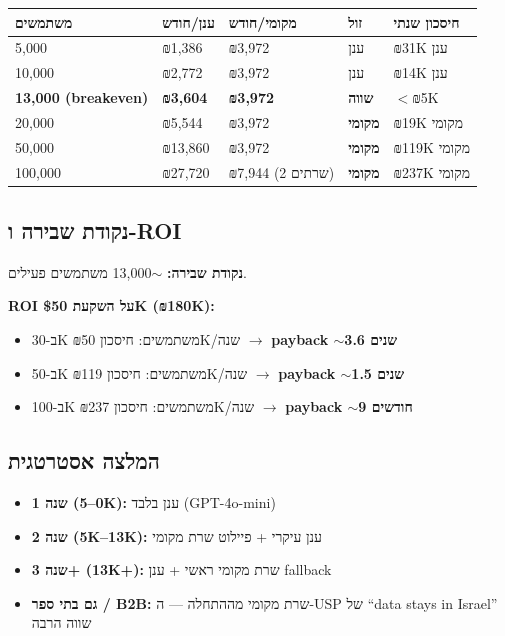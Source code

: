 \documentclass[11pt]{article}
\newcommand{\en}[1]{\textenglish{#1}}
\begin{document}
\begin{longtable}{|>{\raggedright\arraybackslash}p{2.5cm}|>{\raggedright\arraybackslash}p{2.5cm}|>{\raggedright\arraybackslash}p{3.0cm}|>{\raggedright\arraybackslash}p{2.0cm}|>{\raggedright\arraybackslash}p{3.5cm}|}
\hline
\rowcolor{hdr}
\textbf{משתמשים} & \textbf{ענן/חודש} & \textbf{מקומי/חודש} & \textbf{זול} & \textbf{חיסכון שנתי} \\
\hline
\endhead
\en{5,000} & ₪\en{1,386} & ₪\en{3,972} & ענן & ₪\en{31K} ענן \\ \hline
\rowcolor{ltgray}
\en{10,000} & ₪\en{2,772} & ₪\en{3,972} & ענן & ₪\en{14K} ענן \\ \hline
\textbf{\en{13,000} (\en{breakeven})} & \textbf{₪\en{3,604}} & \textbf{₪\en{3,972}} & \textbf{שווה} & $<$₪\en{5K} \\ \hline
\rowcolor{ltgray}
\en{20,000} & ₪\en{5,544} & ₪\en{3,972} & \textbf{מקומי} & ₪\en{19K} מקומי \\ \hline
\en{50,000} & ₪\en{13,860} & ₪\en{3,972} & \textbf{מקומי} & ₪\en{119K} מקומי \\ \hline
\rowcolor{ltgray}
\en{100,000} & ₪\en{27,720} & ₪\en{7,944} (\en{2} שרתים) & \textbf{מקומי} & ₪\en{237K} מקומי \\ \hline
\end{longtable}

\subsection*{נקודת שבירה ו-\en{ROI}}

\textbf{נקודת שבירה:} $\sim$\en{13,000} משתמשים פעילים.

\textbf{\en{ROI} על השקעת \en{\$50K} (₪\en{180K}):}
\begin{itemize}[leftmargin=*]
  \item ב-\en{30K} משתמשים: חיסכון ₪\en{50K}/שנה $\rightarrow$ \textbf{\en{payback} $\sim$\en{3.6} שנים}
  \item ב-\en{50K} משתמשים: חיסכון ₪\en{119K}/שנה $\rightarrow$ \textbf{\en{payback} $\sim$\en{1.5} שנים}
  \item ב-\en{100K} משתמשים: חיסכון ₪\en{237K}/שנה $\rightarrow$ \textbf{\en{payback} $\sim$\en{9} חודשים}
\end{itemize}

\subsection*{המלצה אסטרטגית}

\begin{itemize}[leftmargin=*]
  \item \textbf{שנה 1 (\en{0--5K}):} ענן בלבד (\en{GPT-4o-mini})
  \item \textbf{שנה 2 (\en{5K--13K}):} ענן עיקרי + פיילוט שרת מקומי
  \item \textbf{שנה 3+ (\en{13K+}):} שרת מקומי ראשי + ענן \en{fallback}
  \item \textbf{גם בתי ספר / \en{B2B}:} שרת מקומי מההתחלה — ה-\en{USP} של \en{``data stays in Israel''} שווה הרבה
\end{itemize}
\end{document}

